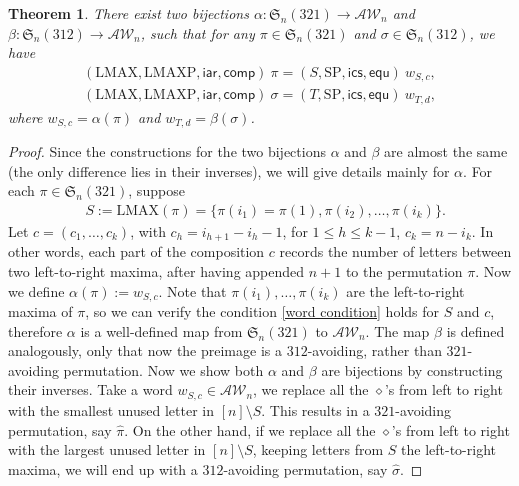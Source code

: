 \documentclass[12pt]{amsart}
\numberwithin{equation}{section}
\theoremstyle{plain}
\newtheorem{theorem}{Theorem}[section]
\theoremstyle{definition}
\def\S{\mathfrak{S}}
\def\iar{\mathsf{iar}}
\def\comp{\mathsf{comp}}
\def\LMAX{\mathrm{LMAX}}
\def\LMAXP{\mathrm{LMAXP}}
\def\AW{\mathcal{AW}}
\def\ics{\mathsf{ics}}
\def\equ{\mathsf{equ}}
\def\SP{\mathrm{SP}}
\begin{document}
\begin{theorem}\label{thm:alpha-beta}
There exist two bijections $\alpha:\S_n(321)\rightarrow \AW_n$ and $\beta:\S_n(312)\rightarrow \AW_n$, such that for any $\pi\in\S_n(321)$ and $\sigma\in\S_n(312)$, we have
\begin{align}
(\LMAX,\LMAXP,\iar,\comp)\:\pi = (S,\SP,\ics,\equ)\:w_{S,c},\label{eq:alpha} \\
(\LMAX,\LMAXP,\iar,\comp)\:\sigma = (T,\SP,\ics,\equ)\:w_{T,d},\label{eq:beta}
\end{align}
where $w_{S,c}=\alpha(\pi)$ and $w_{T,d}=\beta(\sigma)$.
\end{theorem}
\begin{proof}
Since the constructions for the two bijections $\alpha$ and $\beta$ are almost the same (the only difference lies in their inverses), we will give details mainly for $\alpha$. For each $\pi\in\S_n(321)$, suppose
\begin{align*}
&S:=\LMAX(\pi)=\{\pi(i_1)=\pi(1),\pi(i_2),\ldots,\pi(i_k)\}.
\end{align*} 
Let $c=(c_1,\ldots,c_k)$, with $c_h=i_{h+1}-i_h-1$, for $1\le h\le k-1$, $c_k=n-i_k$. In other words, each part of the composition $c$ records the number of letters between two left-to-right maxima, after having appended $n+1$ to the permutation $\pi$. Now we define $\alpha(\pi):=w_{S,c}.$ Note that $\pi(i_1),\ldots,\pi(i_k)$ are the left-to-right maxima of $\pi$, so we can verify the condition \eqref{word condition} holds for $S$ and $c$, therefore $\alpha$ is a well-defined map from $\S_n(321)$ to $\AW_n$. The map $\beta$ is defined analogously, only that now the preimage is a $312$-avoiding, rather than $321$-avoiding permutation. Now we show both $\alpha$ and $\beta$ are bijections by constructing their inverses. Take a word $w_{S,c}\in\AW_n$, we replace all the $\diamond$'s from left to right with the smallest unused letter in $[n]\setminus S$. This results in a $321$-avoiding permutation, say $\hat{\pi}$. On the other hand, if we replace all the $\diamond$'s from left to right with the largest unused letter in $[n]\setminus S$, keeping letters from $S$ the left-to-right maxima, we will end up with a $312$-avoiding permutation, say $\hat{\sigma}$. 


















\end{proof}
\end{document}

